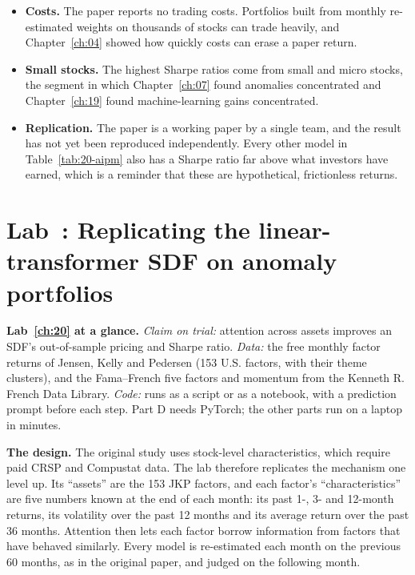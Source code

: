\begin{itemize}
  \item \textbf{Costs.} The paper reports no trading costs. Portfolios built from monthly re-estimated weights on thousands of stocks can trade heavily, and Chapter~\ref{ch:04} showed how quickly costs can erase a paper return.
  \item \textbf{Small stocks.} The highest Sharpe ratios come from small and micro stocks, the segment in which Chapter~\ref{ch:07} found anomalies concentrated and Chapter~\ref{ch:19} found machine-learning gains concentrated.
  \item \textbf{Replication.} The paper is a working paper by a single team, and the result has not yet been reproduced independently. Every other model in Table~\ref{tab:20-aipm} also has a Sharpe ratio far above what investors have earned, which is a reminder that these are hypothetical, frictionless returns.
\end{itemize}

\section{Lab~\thechapter: Replicating the linear-transformer SDF on anomaly portfolios}
\label{sec:20-lab}

\begin{callout}
\textbf{Lab~\ref{ch:20} at a glance.} \emph{Claim on trial:} attention across assets improves an SDF's out-of-sample pricing and Sharpe ratio. \emph{Data:} the free monthly factor returns of Jensen, Kelly and Pedersen (153 U.S. factors, with their theme clusters), and the Fama--French five factors and momentum from the Kenneth R. French Data Library. \emph{Code:} runs as a script or as a notebook, with a prediction prompt before each step. Part D needs PyTorch; the other parts run on a laptop in minutes.
\end{callout}

\textbf{The design.} The original study uses stock-level characteristics, which require paid CRSP and Compustat data. The lab therefore replicates the mechanism one level up. Its ``assets'' are the 153 JKP factors, and each factor's ``characteristics'' are five numbers known at the end of each month: its past 1-, 3- and 12-month returns, its volatility over the past 12 months and its average return over the past 36 months. Attention then lets each factor borrow information from factors that have behaved similarly. Every model is re-estimated each month on the previous 60 months, as in the original paper, and judged on the following month.

